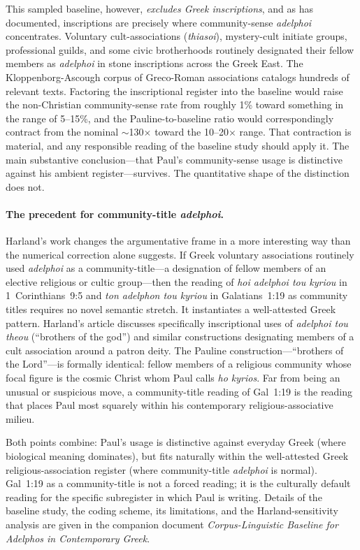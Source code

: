 \documentclass[12pt,oneside]{article}
\newcommand{\grk}[1]{\textit{#1}}   %
\begin{document}
This sampled baseline, however, \textit{excludes Greek inscriptions},
and as \citet{Harland2003,Harland2005} has documented, inscriptions are
precisely where community-sense \grk{adelphoi} concentrates.  Voluntary
cult-associations (\grk{thiasoi}), mystery-cult initiate groups,
professional guilds, and some civic brotherhoods routinely designated
their fellow members as \grk{adelphoi} in stone inscriptions across
the Greek East.  The Kloppenborg-Ascough corpus of Greco-Roman
associations \citep{KloppenborgAscough2011} catalogs hundreds of
relevant texts.  Factoring the inscriptional register into the baseline
would raise the non-Christian community-sense rate from roughly 1\%
toward something in the range of 5--15\%, and the Pauline-to-baseline
ratio would correspondingly contract from the nominal $\sim$130$\times$
toward the 10--20$\times$ range.  That contraction is material, and
any responsible reading of the baseline study should apply it.  The
main substantive conclusion---that Paul's community-sense usage is
distinctive against his ambient register---survives.  The quantitative
shape of the distinction does not.

\paragraph{The precedent for community-title \grk{adelphoi}.}
Harland's work changes the argumentative frame in a more interesting
way than the numerical correction alone suggests.  If Greek voluntary
associations routinely used \grk{adelphoi} as a community-title---a
designation of fellow members of an elective religious or cultic
group---then the reading of \grk{hoi adelphoi tou kyriou} in
1~Corinthians~9:5 and \grk{ton adelphon tou kyriou} in Galatians~1:19
as community titles requires no novel semantic stretch.  It instantiates
a well-attested Greek pattern.  Harland's \citeyear{Harland2005} article
discusses specifically inscriptional uses of \grk{adelphoi tou theou}
(\enquote{brothers of the god}) and similar constructions designating
members of a cult association around a patron deity.  The Pauline
construction---\enquote{brothers of the Lord}---is formally identical:
fellow members of a religious community whose focal figure is the
cosmic Christ whom Paul calls \grk{ho kyrios}.  Far from being an
unusual or suspicious move, a community-title reading of Gal~1:19 is
the reading that places Paul most squarely within his contemporary
religious-associative milieu.

Both points combine: Paul's usage is distinctive against everyday
Greek (where biological meaning dominates), but fits naturally within
the well-attested Greek religious-association register (where
community-title \grk{adelphoi} is normal).  Gal~1:19 as a
community-title is not a forced reading; it is the culturally default
reading for the specific subregister in which Paul is writing.
Details of the baseline study, the coding scheme, its limitations, and
the Harland-sensitivity analysis are given in the companion document
\textit{Corpus-Linguistic Baseline for Adelphos in Contemporary Greek}.
\end{document}
